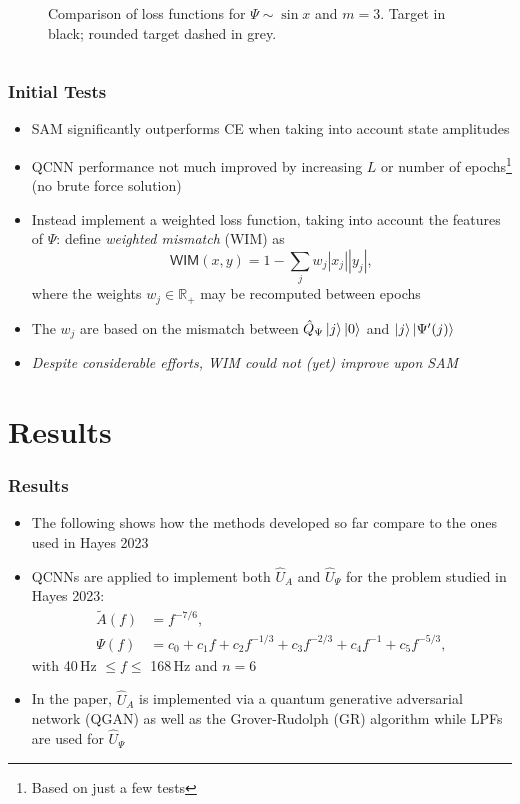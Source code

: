 \documentclass{beamer}
\begin{document}
\begin{frame}
\begin{columns}
\begin{column}{0.5\textwidth}
\begin{figure}[h]
\caption{Comparison of loss functions for $\Psi \sim \sin x$ and $m=3$. Target in black; rounded target dashed in grey.}
\end{figure}
\end{column}
\end{columns}
\end{frame}

\begin{frame}
\frametitle{Initial Tests}
\begin{itemize}
\item \alert{SAM} significantly \alert{outperforms CE} when taking into account state amplitudes 
\item QCNN performance not much improved by increasing $L$ or number of epochs\footnote{Based on just a few tests} (\alert{no brute force solution})
\item Instead implement a \alert{weighted loss function}, taking into account the features of $\Psi$: define \emph{weighted mismatch} (\alert{WIM}) as 
\begin{equation}
\mathsf{WIM}(x,y) =  1 - \sum_j w_j | x_j | | y_j |, 
\end{equation}
where the weights $w_j \in \mathbb{R}_{+}$ may be recomputed between epochs
\item The $w_j$ are based on the mismatch between $\hat{Q}_\Psi \ket{j} \ket{0}$ and $\ket{j}\ket{\Psi'(j)}$
\item\emph{ Despite considerable efforts, WIM could not (yet) improve upon SAM} 
\end{itemize}
\end{frame}

\section{Results}
\begin{frame}
\frametitle{Results}
\begin{itemize}
\item The following shows how the methods developed so far compare to the ones used in Hayes 2023
\item QCNNs are applied to \alert{implement both $\hat{U}_A$ and $\hat{U}_\Psi$} for the problem studied in Hayes 2023:
\begin{align}
\tilde{A}(f) &= f^{-7/6}, \\
\Psi(f) &= c_0 + c_1 f + c_2 f^{-1/3} + c_3 f^{-2/3} + c_4 f^{-1} + c_5 f^{-5/3},
\end{align}
with 40$\,$Hz $\leq f \leq $ 168$\,$Hz and $n=6$
\item In the paper, $\hat{U}_A$ is implemented via a quantum generative adversarial network (\alert{QGAN}) as well as the Grover-Rudolph (\alert{GR}) algorithm while \alert{LPFs} are used for $\hat{U}_\Psi$
\end{itemize}
\end{frame}
\end{document}
